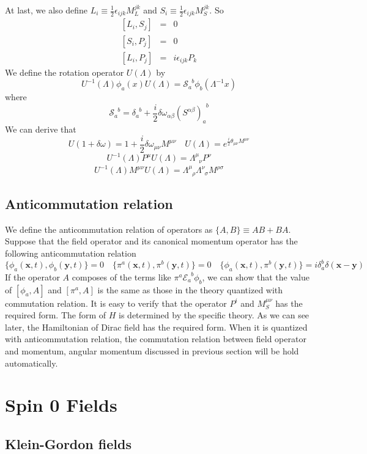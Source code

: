 \documentclass[cyan]{elegantnote}
\begin{document}
At last, we also define $L_i \equiv \frac{1}{2} \epsilon_{ijk} M_L^{jk}$ and $S_i \equiv \frac{1}{2} \epsilon_{ijk} M_S^{jk}$. So
\begin{eqnarray}
\left[L_i,S_j\right] &=& 0 \nonumber \\
\left[S_i,P_j\right] &=& 0 \nonumber \\
\left[L_i,P_j\right] &=& i\epsilon_{ijk}P_k \nonumber
\end{eqnarray}
We define the rotation operator $U(\Lambda)$ by
\[U^{-1}(\Lambda) \phi_a(x) U(\Lambda) = \mathcal{S}_{a}^{\phantom{a}b}\phi_b(\Lambda^{-1}x)\]
where
\[\mathcal{S}_{a}^{\phantom{a}b} = \delta_{a}^{\phantom{a}b}+\frac{i}{2} \delta \omega_{\alpha \beta} (S^{\alpha \beta})_{a}^{\phantom{a}b} \]
We can derive that
\[U(1+\delta \omega) = 1 + \frac{i}{2} \delta \omega_{\mu \nu} M^{\mu \nu} \quad U(\Lambda) = e^{\frac{i}{2} \theta_{\mu \nu} M^{\mu \nu}}\]
\[U^{-1}(\Lambda) P^{\mu} U(\Lambda) = \Lambda^{\mu}_{\phantom{\mu}\nu} P^{\nu}\]
\[U^{-1}(\Lambda) M^{\mu \nu} U(\Lambda) = \Lambda^{\mu}_{\phantom{\mu}\rho} \Lambda^{\nu}_{\phantom{\nu}\sigma}M^{\rho \sigma}\]

\section{Anticommutation relation}
\noindent
We define the anticommutation relation of operators as $\{A,B\} \equiv AB + BA$. Suppose that the field operator and its canonical momentum operator has the following anticommutation relation
\[\{\phi_a(\bm{x},t),\phi_b(\bm{y},t)\} = 0 \quad \{\pi^a(\bm{x},t),\pi^b(\bm{y},t)\} = 0 \quad \{\phi_a(\bm{x},t),\pi^b(\bm{y},t)\} = i \delta_a^b \delta(\bm{x}-\bm{y}) \]
If the operator $A$ composes of the terms like $\pi^a \mathcal{E}_a^{\phantom{a}b} \phi_b$, we can show that the value of $[\phi_a,A]$ and $[\pi^a,A]$ is the same as those in the theory quantized with commutation relation. It is easy to verify that the operator $P^i$ and $M_S^{\mu \nu}$ has the required form. The form of $H$ is determined by the specific theory. As we can see later, the Hamiltonian of Dirac field  has the required form. When it is quantized with anticommutation relation, the commutation relation between field operator and momentum, angular momentum discussed in previous section will be hold automatically. 

\chapter{Spin 0 Fields}
\section{Klein-Gordon fields}
\end{document}
